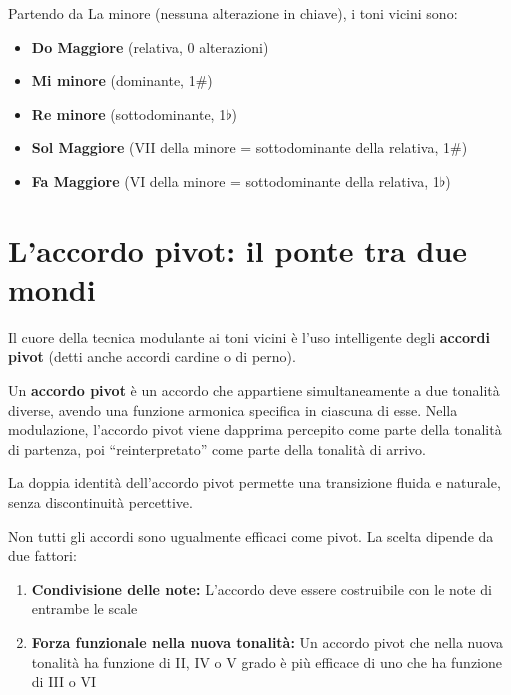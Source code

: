 \begin{esempio}
	\label{ex:toni_vicini_la_m}
	Partendo da La minore (nessuna alterazione in chiave), i toni vicini sono:
	
	\begin{itemize}
		\item \textbf{Do Maggiore} (relativa, 0 alterazioni)
		\item \textbf{Mi minore} (dominante, 1\#)
		\item \textbf{Re minore} (sottodominante, 1$\flat$)
		\item \textbf{Sol Maggiore} (VII della minore = sottodominante della relativa, 1\#)
		\item \textbf{Fa Maggiore} (VI della minore = sottodominante della relativa, 1$\flat$)
	\end{itemize}
\end{esempio}

\section{L'accordo pivot: il ponte tra due mondi}
\label{sec:accordo_pivot}

Il cuore della tecnica modulante ai toni vicini è l'uso intelligente degli \textbf{accordi pivot} (detti anche accordi cardine o di perno).

\begin{definizione}
	\label{def:accordo_pivot}
	Un \textbf{accordo pivot} è un accordo che appartiene simultaneamente a due tonalità diverse, avendo una funzione armonica specifica in ciascuna di esse. Nella modulazione, l'accordo pivot viene dapprima percepito come parte della tonalità di partenza, poi ``reinterpretato'' come parte della tonalità di arrivo.
	
	La doppia identità dell'accordo pivot permette una transizione fluida e naturale, senza discontinuità percettive.
\end{definizione}

Non tutti gli accordi sono ugualmente efficaci come pivot. La scelta dipende da due fattori:

\begin{enumerate}
	\item \textbf{Condivisione delle note:} L'accordo deve essere costruibile con le note di entrambe le scale
	\item \textbf{Forza funzionale nella nuova tonalità:} Un accordo pivot che nella nuova tonalità ha funzione di II, IV o V grado è più efficace di uno che ha funzione di III o VI
\end{enumerate}

